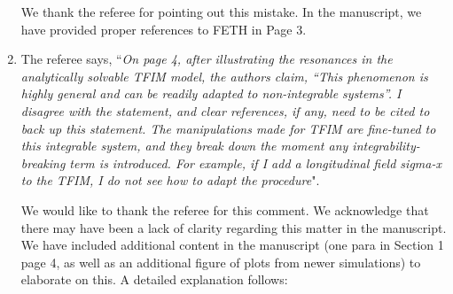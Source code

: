 \documentclass[aps,prb,reprint,showpacs,floatfix,superscriptaddress, onecolumn, nofootinbib, 9pt]{revtex4-2}
\newcommand{\response}[1]{{\color{black}#1}} %
\newcommand{\comment}[1]{{\color{blue}#1}} %
\begin{document}
\begin{enumerate}
		\response{
			We thank the referee for pointing out this mistake. In the manuscript, we have provided proper references to FETH in Page 3.
		}
		
		\item The referee says, \comment{``\textit{On page 4, after illustrating the resonances in the analytically solvable TFIM model, the authors claim, “This phenomenon is highly general and can be readily adapted to non-integrable systems”. I disagree with the statement, and clear references, if any, need to be cited to back up this statement. The manipulations made for TFIM are fine-tuned to this integrable system, and they break down the moment any integrability-breaking term is introduced. For example, if I add a longitudinal field sigma-x to the TFIM, I do not see how to adapt the procedure}"}.\\
		
		\response{ We would like to thank the referee for this comment. We acknowledge that there may have been a lack of clarity regarding this matter in the manuscript. We have included additional content in the manuscript (one para in Section 1 page 4, as well as an additional figure of plots from newer simulations) to elaborate on this. A detailed explanation follows:
			
}
\end{enumerate}
\end{document}
